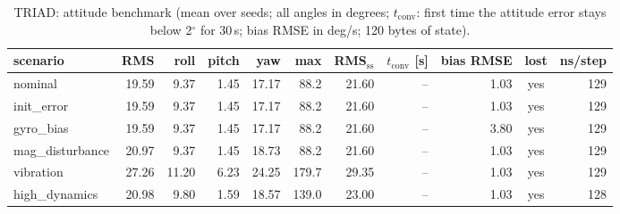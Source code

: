 \begin{table}[H]\centering\footnotesize\setlength{\tabcolsep}{3.5pt}\caption{TRIAD: attitude benchmark (mean over seeds; all angles in degrees; $t_\mathrm{conv}$: first time the attitude error stays below 2$^\circ$ for 30\,s; bias RMSE in deg/s; 120 bytes of state).}\label{tab:imu_TRIAD}
\begin{tabular}{lrrrrrrrrcr}\toprule scenario & RMS & roll & pitch & yaw & max & RMS$_\mathrm{ss}$ & $t_\mathrm{conv}$ [s] & bias RMSE & lost & ns/step \\ \midrule
nominal & 19.59 & 9.37 & 1.45 & 17.17 & 88.2 & 21.60 & -- & 1.03 & yes & 129 \\
init\_error & 19.59 & 9.37 & 1.45 & 17.17 & 88.2 & 21.60 & -- & 1.03 & yes & 129 \\
gyro\_bias & 19.59 & 9.37 & 1.45 & 17.17 & 88.2 & 21.60 & -- & 3.80 & yes & 129 \\
mag\_disturbance & 20.97 & 9.37 & 1.45 & 18.73 & 88.2 & 21.60 & -- & 1.03 & yes & 129 \\
vibration & 27.26 & 11.20 & 6.23 & 24.25 & 179.7 & 29.35 & -- & 1.03 & yes & 129 \\
high\_dynamics & 20.98 & 9.80 & 1.59 & 18.57 & 139.0 & 23.00 & -- & 1.03 & yes & 128 \\
\bottomrule\end{tabular}\end{table}
